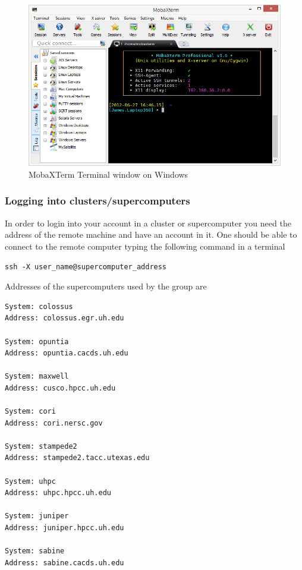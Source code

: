 \documentclass[11pt]{article}
\makeatletter
\def\maxwidth{\ifdim\Gin@nat@width>\linewidth\linewidth
    \else\Gin@nat@width\fi}
\let\Oldincludegraphics\includegraphics
\renewcommand{\includegraphics}[1]{\Oldincludegraphics[width=.8\maxwidth]{#1}}
\makeatother
\begin{document}
\begin{figure}
\centering
\includegraphics{./figures/moba.png}
\caption{MobaXTerm Terminal window on Windows}
\end{figure}

    \subsubsection{Logging into
clusters/supercomputers}\label{logging-into-clusterssupercomputers}

In order to login into your account in a cluster or supercomputer you
need the address of the remote machine and have an account in it. One
should be able to connect to the remote computer typing the following
command in a terminal

\begin{verbatim}
ssh -X user_name@supercomputer_address
\end{verbatim}

Addresses of the supercomputers used by the group are

\begin{verbatim}
System: colossus
Address: colossus.egr.uh.edu

System: opuntia
Address: opuntia.cacds.uh.edu

System: maxwell 
Address: cusco.hpcc.uh.edu

System: cori
Address: cori.nersc.gov

System: stampede2
Address: stampede2.tacc.utexas.edu

System: uhpc
Address: uhpc.hpcc.uh.edu

System: juniper
Address: juniper.hpcc.uh.edu

System: sabine
Address: sabine.cacds.uh.edu
\end{verbatim}
\end{document}
